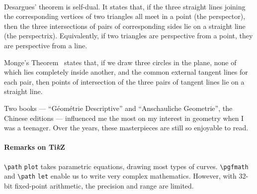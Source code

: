 \begin{BlindRegion}
\paragraph{\InsertSupervisor}
Desargues' theorem is self-dual.
It states that, if the three straight lines joining the corresponding vertices of two triangles all meet in a point (the perspector),
then the three intersections of pairs of corresponding sides lie on a straight line (the perspectrix).
Equivalently, if two triangles are perspective from a point, they are perspective from a line.
\par
Monge's Theorem~\cite{monge1827desgeo} states that, if we draw three circles in the plane, none of which lies completely inside another, and the common external tangent lines for each pair,
then points of intersection of the three pairs of tangent lines lie on a straight line.
\par
Two books --- ``G\'{e}om\'{e}trie Descriptive'' and ``Anschauliche Geometrie'', the Chinese editions --- influenced me the most on my interest in geometry when I was a teenager.
Over the years, these masterpieces are still so enjoyable to read.

\paragraph{Remarks on Ti\emph{k}Z}
{\tt\textbackslash path} {\tt plot} takes parametric equations, drawing most types of curves.
{\tt\textbackslash pgfmath} and {\tt\textbackslash path} {\tt let} enable us to write very complex mathematics.
However, with 32-bit fixed-point arithmetic, the precision and range are limited.

\begin{figure}[b]
\raggedleft
\resizebox{1.44in}{!}{\usebox{\DesarguesPicture}}
\hspace{2em}
\resizebox{1.8in}{!}{\usebox{\MongePicture}}
\end{figure}

\cleardoublepage\pagestyle{empty}
\def\RuledSurf{
\foreach \i in {0,...,\m} {
  \pgfmathsetmacro{\d}{\i/\m*360+5}
  \coordinate (B\i) at ($(b)+(\d:{\bela} and {\belb})$);
  \coordinate (T\i) at ($(t)+(\d:{\tela} and {\telb})$);
}
\draw[very thick,Crimson] (b) ellipse ({\bela} and {\belb});
\foreach \i in {0,...,\m} {
  \pgfmathsetmacro{\j}{Mod(\i+\f,\m)}
  \pgfmathsetmacro{\k}{Mod(\i-\f,\m)}
  \draw[Plum] (T\i) -- (B\j) coordinate (C\i);
  \draw[Tan] (T\i) -- (B\k)  coordinate (D\i);
}
\draw[very thick,Teal] (t) ellipse ({\tela} and {\telb});

}
\end{BlindRegion}
